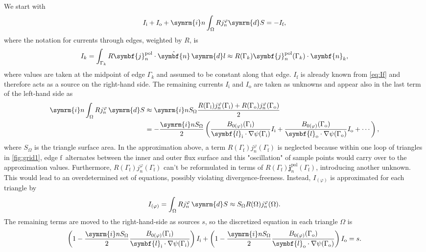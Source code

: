 \documentclass[a4paper, 10pt, english]{article}
\let\temp\varrho
\let\varrho\rho
\let\rho\temp
\let\temp\vartheta
\let\vartheta\theta
\let\theta\temp
\let\temp\varphi
\let\varphi\phi
\let\phi\temp
\let\vec\symbf
\newcommand*\diff{\ensuremath{\symrm{d}}}  %
\newcommand*\im{\ensuremath{\symrm{i}}}  %
\newcommand*\pol{\ensuremath{\textrm{pol}}}  %
\newcommand*\fs{\ensuremath{\textrm{f}}}  %
\newcommand*\inw{\ensuremath{\textrm{i}}}  %
\newcommand*\out{\ensuremath{\textrm{o}}}  %
\begin{document}
We start with
\begin{gather}
  I_{\inw} + I_{\out} + \im n \int_{\Omega} R j_{n}^{\phi} \diff S = -I_{\fs},
\end{gather}
where the notation for currents through edges, weighted by $R$, is
\begin{gather}
  I_{k} = \int_{\Gamma_{k}} R \vec{j}_{n}^{\pol} \cdot \hat{\vec{n}} \, \diff l \approx R (\Gamma_{k}) \vec{j}_{n}^{\pol} (\Gamma_{k}) \cdot \vec{n}_{k},
\end{gather}
where values are taken at the midpoint of edge $\Gamma_{k}$ and assumed to be constant along that edge. $I_{\fs}$ is already known from \cref{eq:If} and therefore acts as a source on the right-hand side. The remaining currents $I_{\inw}$ and $I_{\out}$ are taken as unknowns and appear also in the last term of the left-hand side as
\begin{align}
  \im n \int_{\Omega} R j_{n}^{\phi} \, \diff S & \approx \im n S_{\Omega} \frac{R (\Gamma_{\inw}) j_{n}^{\phi} (\Gamma_{\inw}) + R (\Gamma_{\out}) j_{n}^{\phi} (\Gamma_{\out})}{2} \nonumber \\
  &= -\frac{\im n S_{\Omega}}{2} \left( \frac{B_{0 (\phi)} (\Gamma_{\inw})}{\vec{l}_{\inw} \cdot \nabla \psi (\Gamma_{\inw})} I_{\inw} + \frac{B_{0 (\phi)} (\Gamma_{\out})}{\vec{l}_{\out} \cdot \nabla \psi (\Gamma_{\out})} I_{\out} + \dotsb \right),
\end{align}
where $S_{\Omega}$ is the triangle surface area. In the approximation above, a term $R (\Gamma_{\fs}) j_{n}^{\phi} (\Gamma_{\fs})$ is neglected because within one loop of triangles in \cref{fig:grid1}, edge \fs\ alternates between the inner and outer flux surface and this "oscillation" of sample points would carry over to the approximation values. Furthermore, $R (\Gamma_{\fs}) j_{n}^{\phi} (\Gamma_{\fs})$ can't be reformulated in terms of $R (\Gamma_{\fs}) \vec{j}_{n}^{\pol} (\Gamma_{\fs})$, introducing another unknown. This would lead to an overdetermined set of equations, possibly violating divergence-freeness. Instead, $I_{(\phi)}$ is approximated for each triangle by
\begin{gather}
  I_{(\phi)} = \int_{\Omega} R j_{n}^{\phi} \, \diff S \approx S_{\Omega} R (\Omega) j_{n}^{\phi} (\Omega).
\end{gather}
The remaining terms are moved to the right-hand-side as sources $s$, so the discretized equation in each triangle $\Omega$ is
\begin{gather}
  \left( 1 - \frac{\im n S_{\Omega}}{2} \frac{B_{0 (\phi)} (\Gamma_{\inw})}{\vec{l}_{\inw} \cdot \nabla \psi (\Gamma_{\inw})} \right) I_{\inw} + \left( 1 - \frac{\im n S_{\Omega}}{2} \frac{B_{0 (\phi)} (\Gamma_{\out})}{\vec{l}_{\out} \cdot \nabla \psi (\Gamma_{\out})} \right) I_{\out} = s. \label{eq:Ii-Io}
\end{gather}
\end{document}
